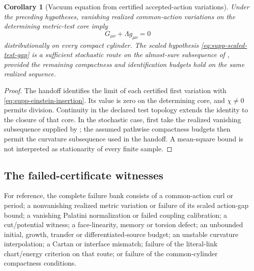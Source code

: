 \documentclass[11pt]{article}
\numberwithin{equation}{section}
\newtheorem{corollary}[corollary]{Corollary}
\theoremstyle{definition}
\theoremstyle{remark}
\begin{document}
\begin{corollary}[Vacuum equation from certified accepted-action variations]
\label{cor:supp-renewal-einstein}
Under the preceding hypotheses, vanishing realized common-action variations
on the determining metric-test core imply
\[
 G_{\mu\nu}+\Lambda g_{\mu\nu}=0
\]
distributionally on every compact cylinder.  The scaled hypothesis
\eqref{eq:supp-scaled-test-gap} is a sufficient stochastic route on the
almost-sure subsequence of ,
provided the remaining compactness and identification budgets hold on the
same realized sequence.
\end{corollary}
\begin{proof}
The handoff identifies the limit of each certified first variation with
\eqref{eq:supp-einstein-insertion}.  Its value is zero on the determining
core, and $\chi\ne0$ permits division.  Continuity in the declared test
topology extends the identity to the closure of that core.  In the stochastic
case, first take the realized vanishing subsequence supplied by
; the assumed pathwise compactness
budgets then permit the curvature subsequence used in the handoff.
A mean-square bound is not interpreted as stationarity of every finite
sample.
\end{proof}

\subsection{The failed-certificate witnesses}
\label{subsec:supp-failed-certificates}

For reference, the complete failure bank consists of a common-action curl
or period; a nonvanishing realized metric variation or failure of its scaled
action-gap bound; a vanishing Palatini normalization or failed coupling
calibration; a cut/potential witness; a face-linearity, memory or torsion
defect; an unbounded initial, growth, transfer or differentiated-source
budget; an unstable curvature interpolation; a Cartan or interface
mismatch; failure of the literal-link chart/energy criterion on that route;
or failure of the common-cylinder compactness conditions.
\end{document}
